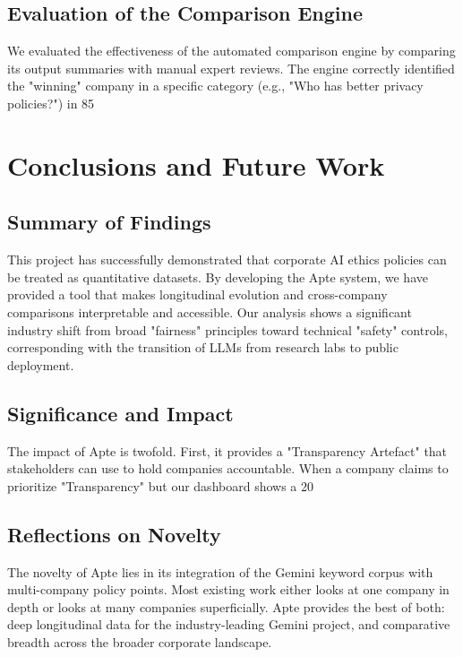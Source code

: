 \documentclass[conference]{IEEEtran}
\begin{document}
\subsection{Evaluation of the Comparison Engine}
We evaluated the effectiveness of the automated comparison engine by comparing its output summaries with manual expert reviews. The engine correctly identified the "winning" company in a specific category (e.g., "Who has better privacy policies?") in 85%

\section{Conclusions and Future Work}

\subsection{Summary of Findings}
This project has successfully demonstrated that corporate AI ethics policies can be treated as quantitative datasets. By developing the Apte system, we have provided a tool that makes longitudinal evolution and cross-company comparisons interpretable and accessible. Our analysis shows a significant industry shift from broad "fairness" principles toward technical "safety" controls, corresponding with the transition of LLMs from research labs to public deployment.

\subsection{Significance and Impact}
The impact of Apte is twofold. First, it provides a "Transparency Artefact" that stakeholders can use to hold companies accountable. When a company claims to prioritize "Transparency" but our dashboard shows a 20%

\subsection{Reflections on Novelty}
The novelty of Apte lies in its integration of the Gemini keyword corpus with multi-company policy points. Most existing work either looks at one company in depth or looks at many companies superficially. Apte provides the best of both: deep longitudinal data for the industry-leading Gemini project, and comparative breadth across the broader corporate landscape.
\end{document}
